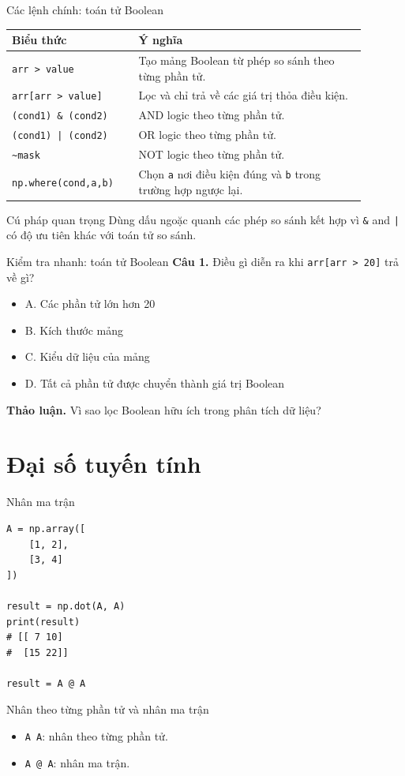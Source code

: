 \documentclass[aspectratio=169,11pt]{beamer}
\newcommand{\quiztitle}[1]{\textbf{\textcolor{QuizOrange}{#1}}}
\begin{document}
\begin{frame}{Các lệnh chính: toán tử Boolean}
\small
\begin{tabular}{p{0.31\linewidth}p{0.58\linewidth}}
\toprule
\textbf{Biểu thức} & \textbf{Ý nghĩa} \\
\midrule
\texttt{arr > value} & Tạo mảng Boolean từ phép so sánh theo từng phần tử. \\
\texttt{arr[arr > value]} & Lọc và chỉ trả về các giá trị thỏa điều kiện. \\
\texttt{(cond1) \& (cond2)} & AND logic theo từng phần tử. \\
\texttt{(cond1) | (cond2)} & OR logic theo từng phần tử. \\
\texttt{\textasciitilde mask} & NOT logic theo từng phần tử. \\
\texttt{np.where(cond,a,b)} & Chọn \texttt{a} nơi điều kiện đúng và \texttt{b} trong trường hợp ngược lại. \\
\bottomrule
\end{tabular}
\begin{block}{Cú pháp quan trọng}
Dùng dấu ngoặc quanh các phép so sánh kết hợp vì \texttt{\&} and \texttt{|} có độ ưu tiên khác với toán tử so sánh.
\end{block}
\end{frame}

\begin{frame}{Kiểm tra nhanh: toán tử Boolean}
\small
\quiztitle{Câu 1.} Điều gì diễn ra khi \texttt{arr[arr > 20]} trả về gì?
\begin{itemize}
  \item A. Các phần tử lớn hơn 20
  \item B. Kích thước mảng
  \item C. Kiểu dữ liệu của mảng
  \item D. Tất cả phần tử được chuyển thành giá trị Boolean
\end{itemize}
\vspace{0.8em}
\quiztitle{Thảo luận.} Vì sao lọc Boolean hữu ích trong phân tích dữ liệu?
\end{frame}

\section{Đại số tuyến tính}

\begin{frame}[fragile]{Nhân ma trận}
\small
\begin{lstlisting}[style=py]
A = np.array([
    [1, 2],
    [3, 4]
])

result = np.dot(A, A)
print(result)
# [[ 7 10]
#  [15 22]]

result = A @ A
\end{lstlisting}
\begin{block}{Nhân theo từng phần tử và nhân ma trận}
\begin{itemize}
  \item \texttt{A \* A}: nhân theo từng phần tử.
  \item \texttt{A @ A}: nhân ma trận.
\end{itemize}
\end{block}
\end{frame}
\end{document}
